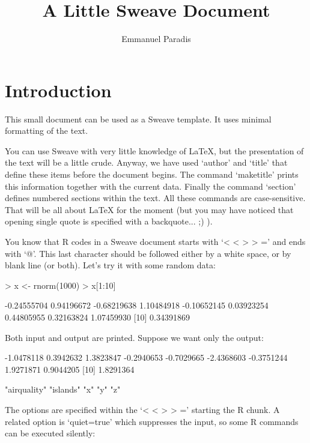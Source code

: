 \documentclass[a4paper]{article}
\author{Emmanuel Paradis}
\title{A Little Sweave Document}
\begin{document}
\maketitle

\section{Introduction}

This small document can be used as a Sweave template. It
uses minimal formatting of the text.

You can use Sweave with very little knowledge of LaTeX, but the
presentation of the text will be a little crude. Anyway, we have used
`author' and `title' that define these items before the document
begins. The command `maketitle' prints this information together with
the current data. Finally the command `section' defines numbered
sections within the text. All these commands are case-sensitive. That
will be all about LaTeX for the moment (but you may have noticed that
opening single quote is specified with a backquote... ;) ).

You know that R codes in a Sweave document starts with `< < > > =' and
ends with `@'. This last character should be followed either by a
white space, or by blank line (or both). Let's try it with some random data:

\begin{Schunk}
\begin{Sinput}
> x <- rnorm(1000)
> x[1:10]
\end{Sinput}
\begin{Soutput}
 [1] -0.24555704  0.94196672 -0.68219638  1.10484918 -0.10652145  0.03923254  0.44805955  0.32163824  1.07459930
[10]  0.34391869
\end{Soutput}
\end{Schunk}

Both input and output are printed. Suppose we want only the output:

\begin{Schunk}
\begin{Soutput}
 [1] -1.0478118  0.3942632  1.3823847 -0.2940653 -0.7029665 -2.4368603 -0.3751244  1.9271871  0.9044205
[10]  1.8291364
\end{Soutput}
\begin{Soutput}
[1] "airquality" "islands"    "x"          "y"          "z"         
\end{Soutput}
\end{Schunk}

The options are specified within the `< < > > =' starting the R chunk. A
related option is `quiet=true' which suppresses the input, so some R
commands can be executed silently:
\end{document}
